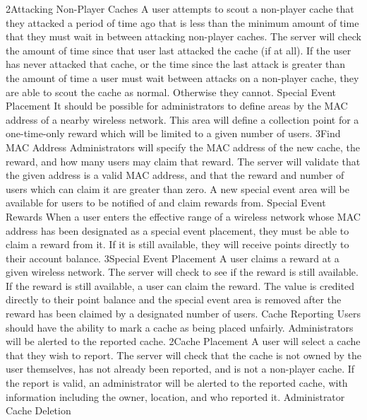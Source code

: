 			{2}{Attacking Non-Player Caches}
			{A user attempts to scout a non-player cache that they attacked a
			period of time ago that is less than the minimum amount of time
			that they must wait in between attacking non-player caches.}
			{The server will check the amount of time since that user last
			attacked the cache (if at all).}
			{If the user has never attacked that cache, or the time since the
			last attack is greater than the amount of time a user must wait
			between attacks on a non-player cache, they are able to scout the
			cache as normal. Otherwise they cannot.}
		\funcreq
			{Special Event Placement}
			{It should be possible for administrators to define areas by the 
			MAC address of a nearby wireless network. This area will define a 
			collection point for a one-time-only reward which will be limited 
			to a given number of users.}
			{3}{Find MAC Address}
			{Administrators will specify the MAC address of the new cache, the 
			reward, and how many users may claim that reward.}
			{The server will validate that the given address is a valid MAC 
			address, and that the reward and number of users which can claim 
			it are greater than zero.}
			{A new special event area will be available for users to be 
			notified of and claim rewards from.}
		\funcreq
			{Special Event Rewards}
			{When a user enters the effective range of a wireless network whose 
			MAC address has been designated as a special event placement, they 
		    must be able to claim a reward from it. If it is still available,
		    they will receive points directly to their account balance.}
			{3}{Special Event Placement}
			{A user claims a reward at a given wireless network.}
			{The server will check to see if the reward is still available.}
			{If the reward is still available, a user can claim the reward. 
			The value is credited directly to their point balance and the 
			special event area is removed after the reward has been claimed by 
			a designated number of users.}
		\funcreq
			{Cache Reporting}
			{Users should have the ability to mark a cache as being placed
			unfairly. Administrators will be alerted to the reported cache.}
			{2}{Cache Placement}
			{A user will select a cache that they wish to report.}
			{The server will check that the cache is not owned by the user
			themselves, has not already been reported, and is not a non-player
			cache.}
			{If the report is valid, an administrator will be alerted to the 
			reported cache, with information including the owner, location, 
			and who reported it.}
		\funcreq
			{Administrator Cache Deletion}
